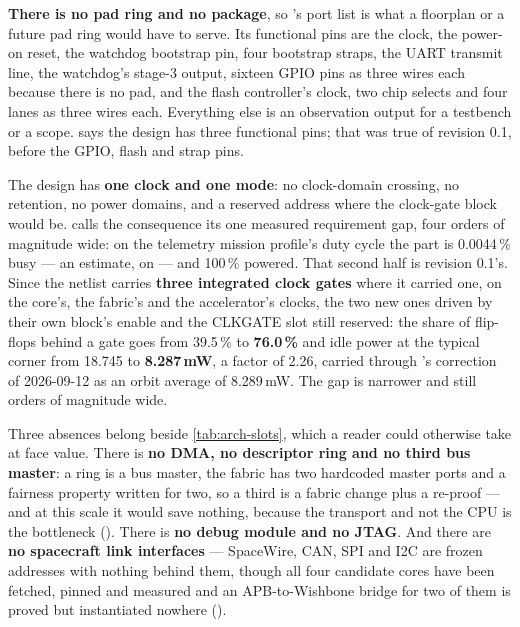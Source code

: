 \textbf{There is no pad ring and no package}, so 's port
list is what a floorplan or a future pad ring would have to serve. Its functional pins are the clock, the power-on reset, the watchdog
bootstrap pin, four bootstrap straps, the UART transmit line, the
watchdog's stage-3 output, sixteen GPIO pins as three wires each because
there is no pad, and the flash controller's clock, two chip selects and
four lanes as three wires each. Everything else is an observation output for a testbench or a scope.  says the
design has three functional pins; that was true of revision 0.1, before
the GPIO, flash and strap pins.

The design has \textbf{one clock and one mode}: no clock-domain crossing,
no retention, no power domains, and a reserved address
where the clock-gate block would be.  calls the
consequence its one measured requirement gap, four orders of magnitude
wide: on the telemetry mission profile's duty cycle the part is
0.0044\,\% busy --- an estimate, on  ---
and 100\,\% powered. That second half is revision 0.1's.
Since  the netlist carries \textbf{three integrated clock
gates} where it carried one, on the core's, the fabric's and the
accelerator's clocks, the two new ones driven by their own block's
enable and the CLKGATE slot still reserved:
the share of flip-flops behind a gate goes
from 39.5\,\% to \textbf{76.0\,\%} and idle power at the typical corner
from 18.745 to \textbf{8.287\,mW}, a factor of 2.26, carried through
's correction of 2026-09-12 as an
orbit average of 8.289\,mW. The gap is narrower and still orders of
magnitude wide.

Three absences belong beside \cref{tab:arch-slots}, which a reader could
otherwise take at face value. There is \textbf{no DMA, no descriptor ring and no third bus master}: a
ring is a bus master, the fabric has two hardcoded master ports and a
fairness property written for two, so a third is a fabric change plus a
re-proof --- and at this scale it would save nothing, because the
transport and not the CPU is the bottleneck
(). There is \textbf{no debug module and no JTAG}. And there are
\textbf{no spacecraft link interfaces} --- SpaceWire, CAN, SPI and I2C
are frozen addresses with nothing behind them, though all four candidate cores have been fetched, pinned and measured
and an APB-to-Wishbone bridge for two of them is proved but instantiated
nowhere ().

